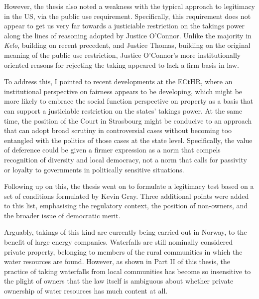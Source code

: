 {{However, the thesis also noted a weakness with the typical approach to legitimacy in the US, via the public use requirement. Specifically, this requirement does not appear to get us very far towards a justiciable restriction on the takings power along the lines of reasoning adopted by Justice O'Connor. Unlike the majority in {\it Kelo}, building on recent precedent, and Justice Thomas, building on the original meaning of the public use restriction, Justice O'Connor's more institutionally oriented reasons for rejecting the taking appeared to lack a firm basis in law.

To address this, I pointed to recent developments at the ECtHR, where an institutional perspective on fairness appears to be developing, which might be more likely to embrace the social function perspective on property as a basis that can support a justiciable restriction on the states' takings power. At the same time, the position of the Court in Strasbourg might be conducive to an approach that can adopt broad scrutiny in controversial cases without becoming too entangled with the politics of those cases at the state level. Specifically, the value of deference could be given a firmer expression as a norm that compels recognition of diversity and local democracy, not a norm that calls for passivity or loyalty to governments in politically sensitive situations.

Following up on this, the thesis went on to formulate a legitimacy test based on a set of conditions formulated by Kevin Gray. Three additional points were added to this list, emphasising the regulatory context, the position of non-owners, and the broader issue of democratic merit. 
}

Arguably, takings of this kind are currently being carried out in Norway, to the benefit of large energy companies. Waterfalls are still nominally considered private property, belonging to members of the rural communities in which the water resources are found. However, as shown in Part II of this thesis, the practice of taking waterfalls from local communities has become so insensitive to the plight of owners that the law itself is ambiguous about whether private ownership of water resources has much content at all.


}
